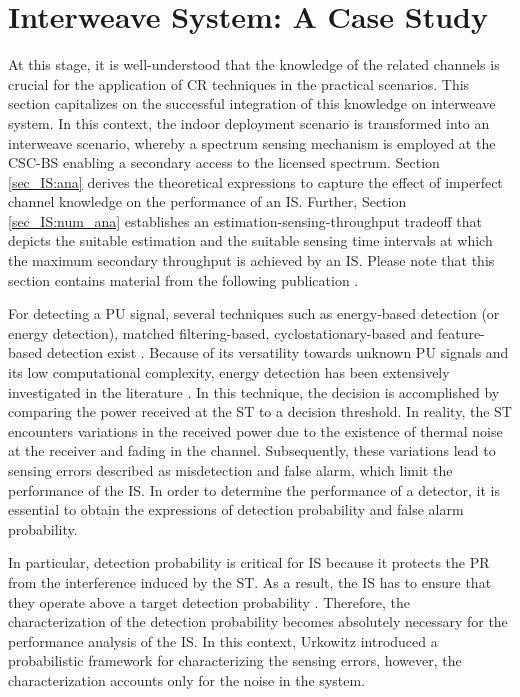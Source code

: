 \section{Interweave System: A Case Study}
\label{sec:IS}
At this stage, it is well-understood that the knowledge of the related channels is crucial for the application of CR techniques in the practical scenarios. This section capitalizes on the successful integration of this knowledge on interweave system. In this context, the indoor deployment scenario is transformed into an interweave scenario, whereby a spectrum sensing mechanism is employed at the CSC-BS enabling a secondary access to the licensed spectrum. Section \ref{sec_IS:ana} derives the theoretical expressions to capture the effect of imperfect channel knowledge on the performance of an IS. Further, Section \ref{sec_IS:num_ana} establishes an estimation-sensing-throughput tradeoff that depicts the suitable estimation and the suitable sensing time intervals at which the maximum secondary throughput is achieved by an IS. Please note that this section contains material from the following publication \cite{Kaushik16_TWC}.

For detecting a PU signal, several techniques such as energy-based detection (or energy detection), matched filtering-based, cyclostationary-based and feature-based detection exist \cite{Axell12}. Because of its versatility towards unknown PU signals and its low computational complexity, energy detection has been extensively investigated in the literature \cite{Urkowitz, Herath09}. In this technique, the decision is accomplished by comparing the power received at the ST to a decision threshold. In reality, the ST encounters variations in the received power due to the existence of thermal noise at the receiver and fading in the channel. Subsequently, these variations lead to sensing errors described as misdetection and false alarm, %
which limit the performance of the IS. In order to determine the performance of a detector, it is essential to obtain the expressions of detection probability and false alarm probability.


In particular, detection probability is critical for IS because it protects the PR from the interference induced by the ST. As a result, the IS has to ensure that they operate above a target detection probability \cite{peh07}. Therefore, the characterization of the detection probability becomes absolutely necessary for the performance analysis of the IS. In this context, Urkowitz \cite{Urkowitz} introduced a probabilistic framework for characterizing the sensing errors, however, the characterization accounts only for the noise in the system.

